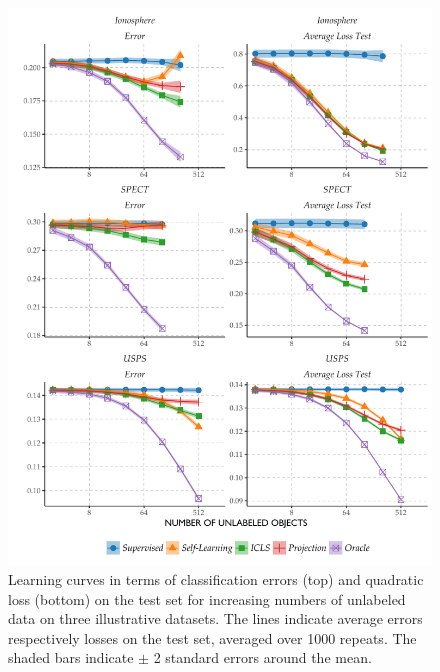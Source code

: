 \documentclass[twoside]{memoir}\usepackage[]{graphicx}\usepackage{xcolor}
\makeatletter
\def\maxwidth{ %
  \ifdim\Gin@nat@width>\linewidth
    \linewidth
  \else
    \Gin@nat@width
  \fi
}
\newenvironment{knitrout}{}{} %
\makeatother
\begin{document}
\begin{knitrout}
\color{fgcolor}\begin{figure}
\includegraphics[width=\maxwidth]{figure/learningcurves-projection-1} \caption[Learning curves in terms of classification errors (top) and quadratic loss (bottom) on the test set for increasing numbers of unlabeled data on three illustrative datasets]{Learning curves in terms of classification errors (top) and quadratic loss (bottom) on the test set for increasing numbers of unlabeled data on three illustrative datasets. The lines indicate average errors respectively losses on the test set, averaged over 1000 repeats. The shaded bars indicate $\pm$ 2 standard errors around the mean.}\label{fig:learningcurves-projection}
\end{figure}


\end{knitrout}
\end{document}
